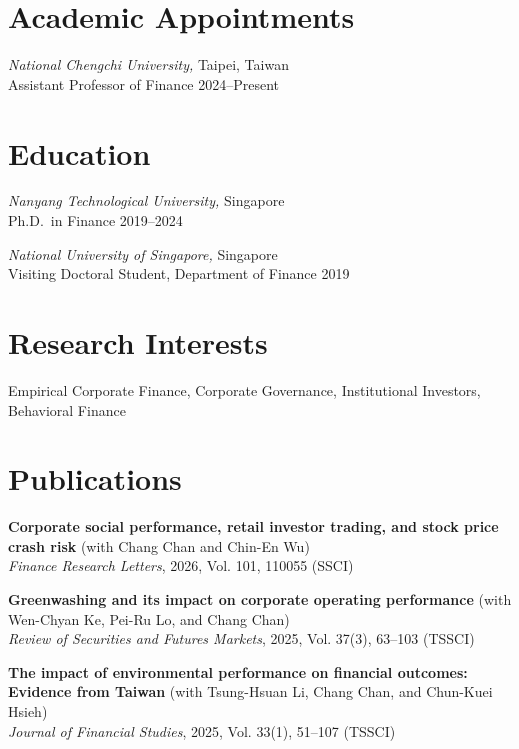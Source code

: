 \documentclass[
  english,
  margin]{res}
\begin{document}
\begin{resume}

\section{Academic Appointments}\label{academic-appointments}

\emph{National Chengchi University,} \hfill Taipei, Taiwan\\
Assistant Professor of Finance \hfill 2024--Present

\section{Education}\label{education}

\emph{Nanyang Technological University,} \hfill Singapore\\
Ph.D.~in Finance \hfill 2019--2024

\emph{National University of Singapore,} \hfill Singapore\\
Visiting Doctoral Student, Department of Finance \hfill 2019

\section{\texorpdfstring{Research
\newline Interests}{Research Interests}}\label{research-interests}

Empirical Corporate Finance, Corporate Governance, Institutional
Investors, Behavioral Finance

\section{Publications}\label{publications}

\textbf{Corporate social performance, retail investor trading, and stock
price crash risk} (with Chang Chan and Chin-En Wu)\\
\emph{Finance Research Letters}, 2026, Vol. 101, 110055 (SSCI)

\textbf{Greenwashing and its impact on corporate operating performance}
(with Wen-Chyan Ke, Pei-Ru Lo, and Chang Chan)\\
\emph{Review of Securities and Futures Markets}, 2025, Vol. 37(3),
63--103 (TSSCI)

\textbf{The impact of environmental performance on financial outcomes:
Evidence from Taiwan} (with Tsung-Hsuan Li, Chang Chan, and Chun-Kuei
Hsieh)\\
\emph{Journal of Financial Studies}, 2025, Vol. 33(1), 51--107 (TSSCI)


\end{resume}
\end{document}
